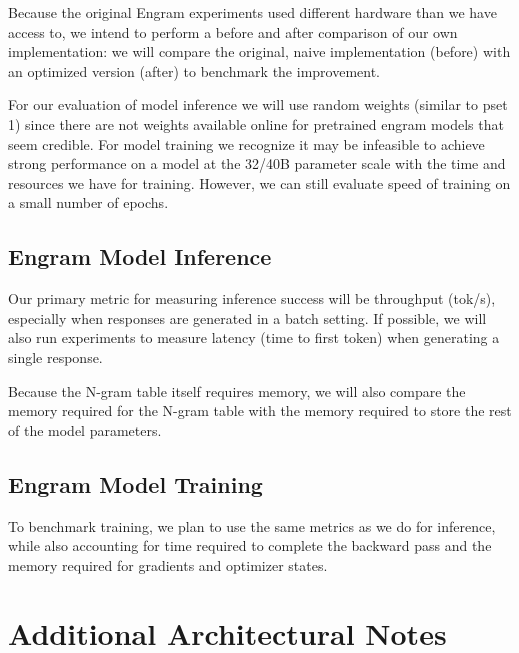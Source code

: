 \documentclass{article}
\begin{document}
Because the original Engram experiments used different hardware than we have access to, we intend to perform a before and after comparison of our own implementation: we will compare the original, naive implementation (before) with an optimized version (after) to benchmark the improvement.
\par For our evaluation of model inference we will use random weights (similar to pset 1) since there are not weights available online for pretrained engram models that seem credible. For model training we recognize it may be infeasible to achieve strong performance on a model at the 32/40B parameter scale with the time and resources we have for training. However, we can still evaluate speed of training on a small number of epochs.

\subsection{Engram Model Inference}

Our primary metric for measuring inference success will be throughput (tok/s), especially when responses are generated in a batch setting. If possible, we will also run experiments to measure latency (time to first token) when generating a single response. 
\par Because the N-gram table itself requires memory, we will also compare the memory required for the N-gram table with the memory required to store the rest of the model parameters.

\subsection{Engram Model Training}

To benchmark training, we plan to use the same metrics as we do for inference, while also accounting for time required to complete the backward pass and the memory required for gradients and optimizer states.





{}




\appendix

\section{Additional Architectural Notes}
\label{app:architecture}
\end{document}
